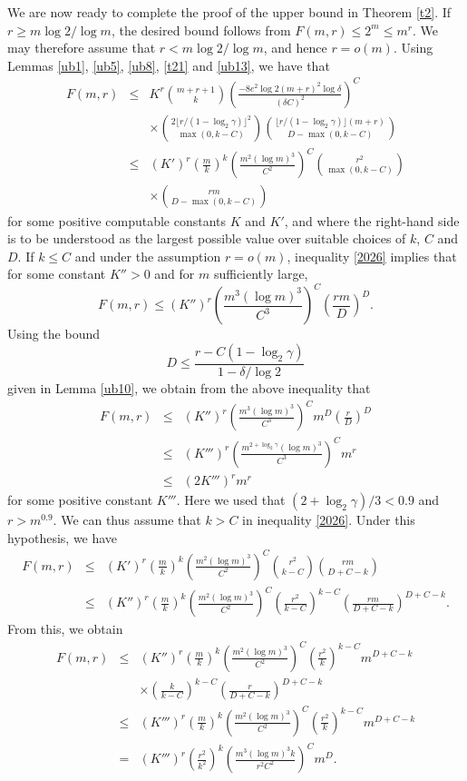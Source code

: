 \documentclass{article}
\theoremstyle{definition}
\begin{document}
We are now ready to complete the proof of the upper bound in Theorem \ref{t2}. If $r\ge m\log 2/\log m$, the desired bound follows from
$
F(m,r)\le 2^m\le m^r.
$
We may therefore assume that $r<m\log 2/\log m$, and hence
$r=o(m)$. Using Lemmas \ref{ub1}, \ref{ub5}, \ref{ub8}, \ref{t21} and \ref{ub13}, we have that
\begin{eqnarray}
F(m,r)&\le& K^r{m+r+1\choose k}\left(\frac{-8e^2\log 2(m+r)^2\log\delta}{(\delta C)^2}\right)^C\nonumber\\
& &\times {2\lfloor r/(1-\log_2 \gamma)\rfloor^2 \choose \max(0, k-C)}{\lfloor r/(1-\log_2 \gamma)\rfloor(m+r) \choose D-\max(0,k-C)} \nonumber\\
&\le& (K')^r \left(\frac{m}{k}\right)^k\left(\frac{m^2(\log m)^3}{C^2}\right)^C{r^2\choose \max(0,k-C)}\nonumber \\
& &\times{rm\choose D-\max(0,k-C)}\label{2026}
\end{eqnarray}
for some positive computable constants $K$ and $K'$, and where the right-hand side is to be understood as the largest possible value over suitable choices of $k$, $C$ and $D$. If $k\leq C$ and under the assumption $r=o(m)$, inequality \eqref{2026} implies that for some constant $K''>0$ and for $m$ sufficiently large,
$$
F(m,r)\le (K'')^r\left(\frac{m^3(\log m)^3}{C^3}\right)^C\left(\frac{rm}{D}\right)^{D}.
$$
Using the bound
$$
D\le \frac{r-C(1-\log_2\gamma)}{1-\delta/\log 2}
$$
given in Lemma \ref{ub10}, we obtain from the above inequality that
\begin{eqnarray*}
F(m,r)&\le& (K'')^r\left(\frac{m^3(\log m)^3}{C^3}\right)^Cm^D\left(\frac{r}{D}\right)^{D}\\
&\le& (K''')^r\left(\frac{m^{2+\log_2\gamma}(\log m)^3}{C^3}\right)^Cm^r\\
&\le& (2K''')^r m^r
\end{eqnarray*}
for some positive constant $K'''$. Here we used that $(2+\log_2\gamma)/3<0.9$ and $r>m^{0.9}$. We can thus assume that $k>C$ in inequality \eqref{2026}. Under this hypothesis, we have
\begin{eqnarray*}
F(m,r)&\le& (K')^r \left(\frac{m}{k}\right)^k\left(\frac{m^2(\log m)^3}{C^2}\right)^C{r^2\choose k-C}{rm \choose D+C-k}\\
&\le& (K'')^r\left(\frac{m}{k}\right)^k\left(\frac{ m^2(\log m)^3}{C^2 }\right)^C \left(\frac{r^2}{k-C}\right)^{k-C}\left(\frac{rm}{D+C-k}\right)^{D+C-k}.
\end{eqnarray*}
From this, we obtain
\begin{eqnarray*}
F(m,r)&\le& (K'')^r \left(\frac{m}{k}\right)^k\left(\frac{ m^2(\log m)^3}{C^2 }\right)^C\left(\frac{r^2}{k}\right)^{k-C} m^{D+C-k}\\
& &\times \left(\frac{k}{k-C}\right)^{k-C}\left(\frac{r}{D+C-k}\right)^{D+C-k}\\
&\le&(K''')^r \left(\frac{m}{k}\right)^k\left(\frac{ m^2(\log m)^3}{C^2 }\right)^C\left(\frac{r^2}{k}\right)^{k-C} m^{D+C-k}\\
&=&(K''')^r \left(\frac{r^2}{k^2}\right)^k\left(\frac{ m^3(\log m)^3k}{r^2C^2 }\right)^Cm^D.
\end{eqnarray*}
\end{document}
